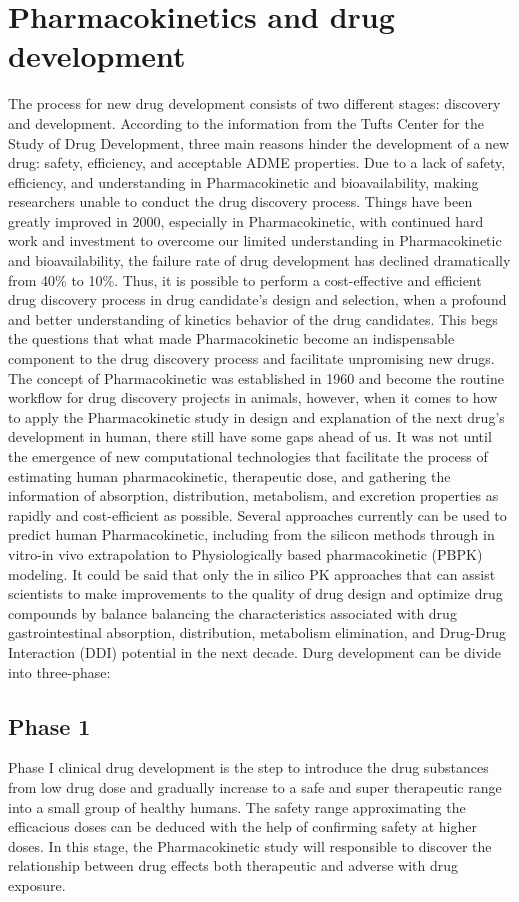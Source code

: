\documentclass[12pt]{article}
\begin{document}
\medskip
\section{Pharmacokinetics and drug development}
The process for new drug development consists of two different stages: discovery and development. According to the information from the Tufts Center for the Study of Drug Development, three main reasons hinder the development of a new drug: safety, efficiency, and acceptable ADME properties.
Due to a lack of safety, efficiency, and understanding in Pharmacokinetic and bioavailability, making researchers unable to conduct the drug discovery process. Things have been greatly improved in 2000, especially in Pharmacokinetic, with continued hard work and investment to overcome our limited understanding in Pharmacokinetic and bioavailability, the failure rate of drug development has declined dramatically from 40\% to 10\%. Thus, it is possible to perform a cost-effective and efficient drug discovery process in drug candidate's design and selection, when a profound and better understanding of kinetics behavior of the drug candidates. This begs the questions that what made Pharmacokinetic become an indispensable component to the drug discovery process and facilitate unpromising new drugs. The concept of Pharmacokinetic was established in 1960 and become the routine workflow for drug discovery projects in animals, however,
when it comes to how to apply the Pharmacokinetic study in design and explanation of the next drug’s development in human, there still have some gaps ahead of us. It was not until the emergence of new computational technologies that facilitate the process of estimating human pharmacokinetic, therapeutic dose, and gathering the information of absorption, distribution, metabolism, and excretion properties as rapidly and cost-efficient as possible. Several approaches currently can be used to predict human Pharmacokinetic, including from the silicon methods through in vitro-in vivo extrapolation to Physiologically based pharmacokinetic (PBPK) modeling. It could be said that only the in silico PK approaches that can assist scientists to make improvements to the quality of drug design and optimize drug compounds by balance balancing the characteristics associated with drug gastrointestinal absorption, distribution, metabolism elimination, and Drug-Drug Interaction (DDI) potential in the next decade. Durg development can be divide into three-phase:
\subsection{Phase 1}
Phase I clinical drug development is the step to introduce the drug substances from low drug dose and gradually increase to a safe and super therapeutic range into a small group of healthy humans. The safety range approximating the efficacious doses can be deduced with the help of confirming safety at higher doses. In this stage, the Pharmacokinetic study will responsible to discover the relationship between drug effects both therapeutic and adverse with drug exposure.
\end{document}
